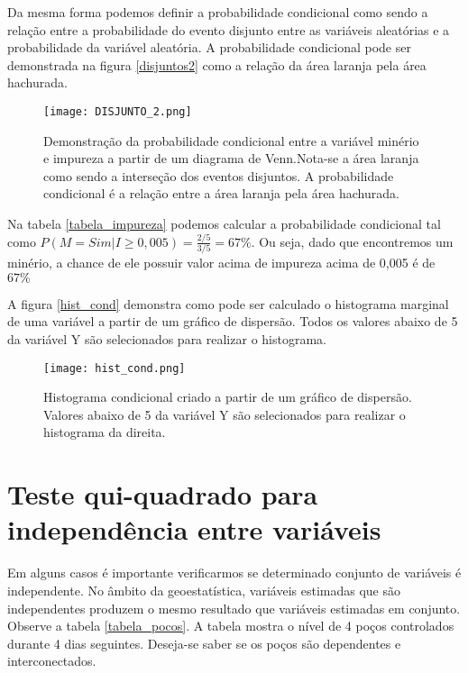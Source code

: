 Da mesma forma podemos definir a probabilidade condicional como sendo a relação entre a probabilidade do evento disjunto entre as variáveis aleatórias e a probabilidade da variável aleatória. A probabilidade condicional pode ser demonstrada na figura \eqref{disjuntos2} como a relação da área laranja pela área hachurada.

\begin{figure}[H]
	\centering
	\texttt{[image: DISJUNTO\_2.png]}	
	\caption{Demonstração da probabilidade condicional entre a variável minério e impureza a partir de um diagrama de Venn.Nota-se a área laranja como sendo a interseção dos eventos disjuntos. A probabilidade condicional é a relação entre a área laranja pela área hachurada. }
	\label{disjuntos2}
\end{figure} 
   
Na tabela \ref{tabela_impureza} podemos calcular a probabilidade condicional tal como  $P(M=Sim | I \geq 0,005) = \frac{2/5}{3/5} = 67\%$. Ou seja, dado que encontremos um minério, a chance de ele possuir valor acima de impureza acima de 0,005 é de $67\%$

A figura \eqref{hist_cond} demonstra como pode ser calculado o histograma marginal de uma variável a partir de um gráfico de dispersão. Todos os valores abaixo de 5 da variável Y são selecionados para realizar o  histograma. 

\begin{figure}[H]
	\centering
	\texttt{[image: hist\_cond.png]}	
	\caption{Histograma condicional criado a partir de um gráfico de dispersão. Valores abaixo de 5 da variável Y são selecionados para realizar o histograma da direita.  }
	\label{hist_cond}
\end{figure}

\section{Teste qui-quadrado para independência entre variáveis}

Em alguns casos é importante verificarmos se determinado conjunto de variáveis é independente. No âmbito da geoestatística, variáveis estimadas que são independentes produzem o mesmo resultado que variáveis estimadas em conjunto. Observe a tabela \eqref{tabela_pocos}. A tabela mostra o nível de 4 poços controlados durante 4 dias seguintes. Deseja-se saber se os poços são dependentes e interconectados. 

